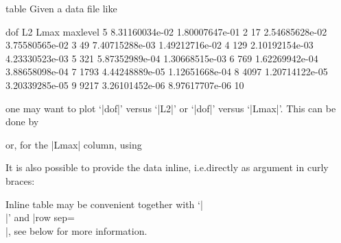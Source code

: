 {\begin{addplotoperation}[]{table}{}
Given a data file like
%
\begin{codeexample}
dof     L2              Lmax            maxlevel
5       8.31160034e-02  1.80007647e-01  2
17      2.54685628e-02  3.75580565e-02  3
49      7.40715288e-03  1.49212716e-02  4
129     2.10192154e-03  4.23330523e-03  5
321     5.87352989e-04  1.30668515e-03  6
769     1.62269942e-04  3.88658098e-04  7
1793    4.44248889e-05  1.12651668e-04  8
4097    1.20714122e-05  3.20339285e-05  9
9217    3.26101452e-06  8.97617707e-06  10
\end{codeexample}
%
one may want to plot `|dof|' versus `|L2|' or `|dof|' versus `|Lmax|'. This can
be done by
%
\begin{codeexample}
\end{codeexample}
%
or, for the |Lmax| column, using
%
\begin{codeexample}
\end{codeexample}
%
It is also possible to provide the data inline, i.e.\@ directly as argument in
curly braces:
%
\begin{codeexample}
\end{codeexample}
%
\noindent Inline table may be convenient together with `|\\|' and |row sep=\\|,
see below for more information.


\end{addplotoperation}}
